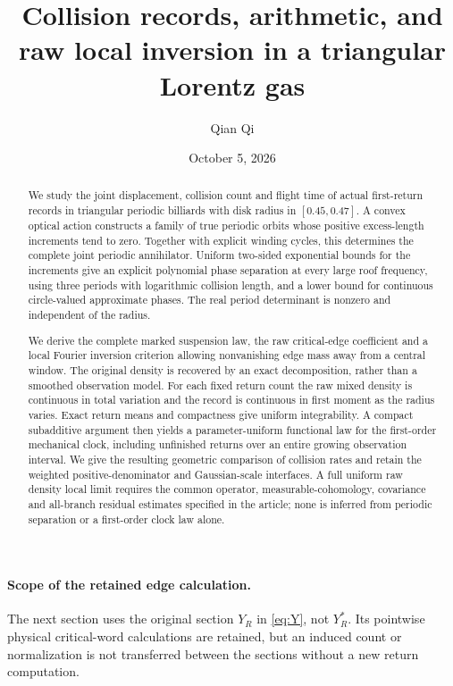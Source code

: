 \documentclass[11pt,reqno]{amsart}
\title[Collision records and raw local inversion]{Collision records, arithmetic, and raw local inversion in a triangular Lorentz gas}
\author{Qian Qi}
\date{October 5, 2026}
\numberwithin{equation}{section}
\theoremstyle{definition}\newtheorem{definition}[theorem]{Definition}
\theoremstyle{remark}\newtheorem{remark}[theorem]{Remark}
\begin{document}
\raggedbottom
\begin{abstract}
We study the joint displacement, collision count and flight time of actual
first-return records in triangular periodic billiards with disk radius in
$[0.45,0.47]$. A convex optical action constructs a family of true periodic
orbits whose positive excess-length increments tend to zero. Together with
explicit winding cycles, this determines the complete joint periodic
annihilator. Uniform two-sided exponential bounds for the increments give
an explicit polynomial phase separation at every large roof frequency,
using three periods with logarithmic collision length, and a lower bound
for continuous circle-valued approximate phases. The real period determinant
is nonzero and independent of the radius.

We derive the complete marked suspension law, the raw critical-edge
coefficient and a local Fourier inversion criterion allowing nonvanishing
edge mass away from a central window. The original density is recovered
by an exact decomposition, rather than a smoothed observation model.
For each fixed return count the raw mixed density is continuous in total
variation and the record is continuous in first moment as the radius
varies. Exact return means and compactness give uniform integrability.
A compact subadditive argument then yields a parameter-uniform functional
law for the first-order mechanical clock, including unfinished returns over
an entire growing observation interval. We give the resulting geometric
comparison of collision rates and retain the weighted positive-denominator
and Gaussian-scale interfaces. A full uniform raw density local limit
requires the common operator, measurable-cohomology, covariance and
all-branch residual estimates specified in the article; none is inferred
from periodic separation or a first-order clock law alone.
\end{abstract}
\maketitle






\paragraph{Scope of the retained edge calculation.}
The next section uses the original section $Y_R$ in \eqref{eq:Y}, not
$Y_R^*$. Its pointwise physical critical-word calculations are retained,
but an induced count or normalization is not transferred between the
sections without a new return computation.









\end{document}

